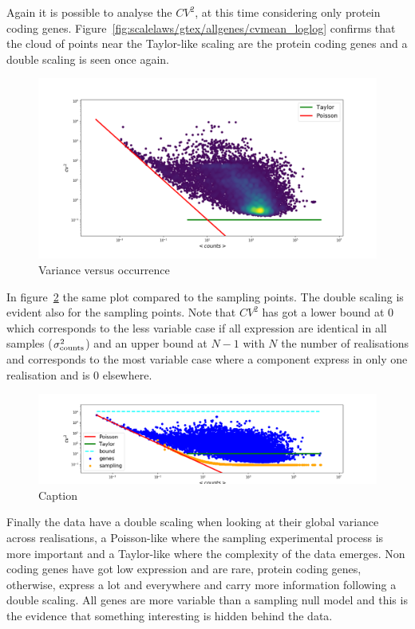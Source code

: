 Again it is possible to analyse the $CV^2$, at this time considering only protein coding genes. Figure~\ref{fig:scalelaws/gtex/allgenes/cvmean_loglog} confirms that the cloud of points near the Taylor-like scaling are the protein coding genes and a double scaling is seen once again.
\begin{figure}[htb!]
    \centering
    \includegraphics[width=0.9\linewidth]{pictures/scalelaws/gtex/cvmean_loglog_density.png}
    \caption{Variance versus occurrence}
    \label{fig:scalelaws/gtex/cvmean_loglog}
\end{figure}

In figure~\ref{fig:scalelaws/gtex/cvmean_loglog_sampling} the same plot compared to the sampling points. The double scaling is evident also for the sampling points. Note that $CV^2$ has got a lower bound at $0$ which corresponds to the less variable case if all expression are identical in all samples ($\sigma^2_{\mathrm{counts}}$) and an upper bound at $N-1$ with $N$ the number of realisations and corresponds to the most variable case where a component  express in only one realisation and is $0$ elsewhere.
\begin{figure}[htb!]
    \centering
    \includegraphics[width=0.9\linewidth]{pictures/scalelaws/gtex/cvmean_loglog_sampling.png}
    \caption{Caption}
    \label{fig:scalelaws/gtex/cvmean_loglog_sampling}
\end{figure}

Finally the data have a double scaling when looking at their global variance across realisations, a Poisson-like where the sampling experimental process is more important and a Taylor-like where the complexity of the data emerges.
Non coding genes have got low expression and are rare, protein coding genes, otherwise, express a lot and everywhere and carry more information following a double scaling. All genes are more variable than a sampling null model and this is the evidence that something interesting is hidden behind the data.
